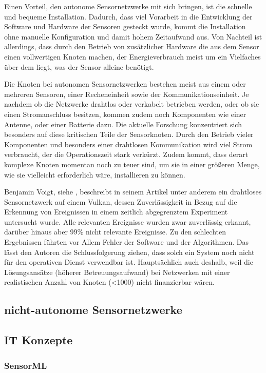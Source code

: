 Einen Vorteil, den autonome Sensornetzwerke mit sich bringen, ist die schnelle und bequeme Installation. Dadurch, dass viel Vorarbeit in die Entwicklung der Software und Hardware der Sensoren gesteckt wurde, kommt die Installation ohne manuelle Konfiguration und damit hohem Zeitaufwand aus. Von Nachteil ist allerdings, dass durch den Betrieb von zusätzlicher Hardware die aus dem Sensor einen vollwertigen Knoten machen, der Energieverbrauch meist um ein Vielfaches über dem liegt, was der Sensor alleine benötigt.

Die Knoten bei autonomen Sensornetzwerken bestehen meist aus einem oder mehreren Sensoren, einer Recheneinheit sowie der Kommunikationseinheit. Je nachdem ob die Netzwerke drahtlos oder verkabelt betrieben werden, oder ob sie einen Stromanschluss besitzen, kommen zudem noch Komponenten wie einer Antenne, oder einer Batterie dazu. Die aktuelle Forschung konzentriert sich besonders auf diese kritischen Teile der Sensorknoten. Durch den Betrieb vieler Komponenten und besonders einer drahtlosen Kommunikation wird viel Strom verbraucht, der die Operationszeit stark verkürzt. Zudem kommt, dass derart komplexe Knoten momentan noch zu teuer sind, um sie in einer größeren Menge, wie sie vielleicht erforderlich wäre, installieren zu können.

Benjamin Voigt, siehe \citep{voigt_illustration_2013}, beschreibt in seinem Artikel unter anderem ein drahtloses Sensornetzwerk auf einem Vulkan, dessen Zuverlässigkeit in Bezug auf die Erkennung von Ereignissen in einem zeitlich abgegrenztem Experiment untersucht wurde. Alle relevanten Ereignisse wurden zwar zuverlässig erkannt, darüber hinaus aber 99\%  nicht relevante Ereignisse. Zu den schlechten Ergebnissen führten vor Allem Fehler der Software und der Algorithmen. Das lässt den Autoren die Schlussfolgerung ziehen, dass solch ein System noch nicht für den operativen Dienst verwendbar ist. Hauptsächlich auch deshalb, weil die Lösungsansätze (höherer Betreuungsaufwand) bei Netzwerken mit einer realistischen Anzahl von Knoten (<1000) nicht finanzierbar wären.

\subsection{nicht-autonome Sensornetzwerke}


\subsection{IT Konzepte}
\subsubsection{SensorML}
